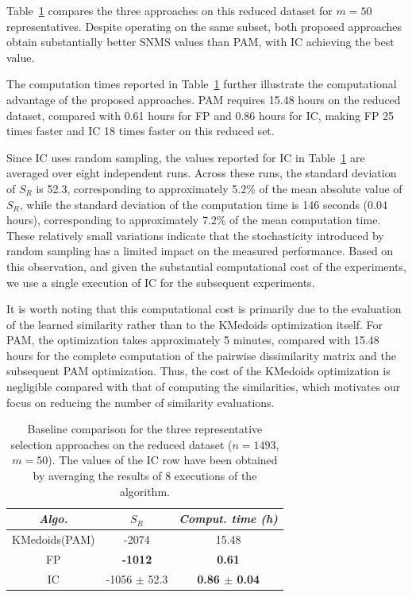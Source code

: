 \documentclass{ieeeaccess}
\newcommand{\kmedoidsalg}{KMedoids\xspace}
\newcommand{\partitioning}{FP\xspace}
\newcommand{\inclusion}{IC\xspace}
\begin{document}
Table~\ref{tab:baseline} compares the three approaches on this reduced dataset for $m=50$ representatives. Despite operating on the same subset, both proposed approaches obtain substantially better SNMS values than PAM, with \inclusion achieving the best value. 

The computation times reported in Table~\ref{tab:baseline} further illustrate the computational advantage of the proposed approaches. PAM requires 15.48 hours on the reduced dataset, compared with 0.61 hours for \partitioning and 0.86 hours for \inclusion, making \partitioning 25 times faster and \inclusion 18 times faster on this reduced set. 

Since \inclusion uses random sampling, the values reported for \inclusion in Table~\ref{tab:baseline} are averaged over eight independent runs. Across these runs, the standard deviation of $S_R$ is 52.3, corresponding to approximately 5.2\% of the mean absolute value of $S_R$, while the standard deviation of the computation time is 146 seconds (0.04 hours), corresponding to approximately 7.2\% of the mean computation time. These relatively small variations indicate that the stochasticity introduced by random sampling has a limited impact on the measured performance. Based on this observation, and given the substantial computational cost of the experiments, we use a single execution of \inclusion for the subsequent experiments.

It is worth noting that this computational cost is primarily due to the evaluation of the learned similarity rather than to the \kmedoidsalg optimization itself. For PAM, the optimization takes approximately 5 minutes, compared with 15.48 hours for the complete computation of the pairwise dissimilarity matrix and the subsequent PAM optimization. Thus, the cost of the \kmedoidsalg optimization is negligible compared with that of computing the similarities, which motivates our focus on reducing the number of similarity evaluations.

\begin{table}[htbp]
    \centering \normalsize
    \begin{tabular}{ |c|c|c| } 
     \hline
     \textit{Algo.} & $S_R$ & \textit{Comput. time (h)} \\
     \hline
     \kmedoidsalg (PAM) & -2074 & 15.48 \\ 
     {\partitioning} & \textbf{-1012} & \textbf{0.61} \\ 
     \inclusion &{-1056 $\pm$ 52.3} &
 \textbf{0.86 $\pm$ 0.04} \\
     \hline
    \end{tabular}
    \caption{\label{tab:baseline}
    Baseline comparison for the three representative selection approaches on the reduced dataset ($n=1493$, $m=50$). The values of the \inclusion row have been obtained by averaging the results of 8 executions of the algorithm.
    }
\end{table}
\end{document}

